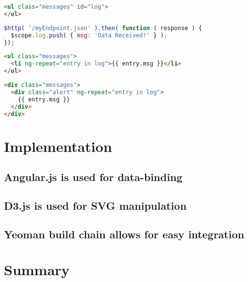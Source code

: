 \begin{lstlisting}[language=html]
<ul class="messages" id="log">
</ul>
\end{lstlisting}

\begin{lstlisting}[language=JavaScript]
$http( '/myEndpoint.json' ).then( function ( response ) {
  $scope.log.push( { msg: 'Data Received!' } );
});
\end{lstlisting}

\begin{lstlisting}[language=html]
<ul class="messages">
  <li ng-repeat="entry in log">{{ entry.msg }}</li>
</ul>
\end{lstlisting}

\begin{lstlisting}[language=html]
<div class="messages">
  <div class="alert" ng-repeat="entry in log">
    {{ entry.msg }}
  </div>
</div>
\end{lstlisting}

\section{Implementation}
\subsection{Angular.js is used for data-binding}
\subsection{D3.js is used for SVG manipulation}
\subsection{Yeoman build chain allows for easy integration}

\section{Summary}
